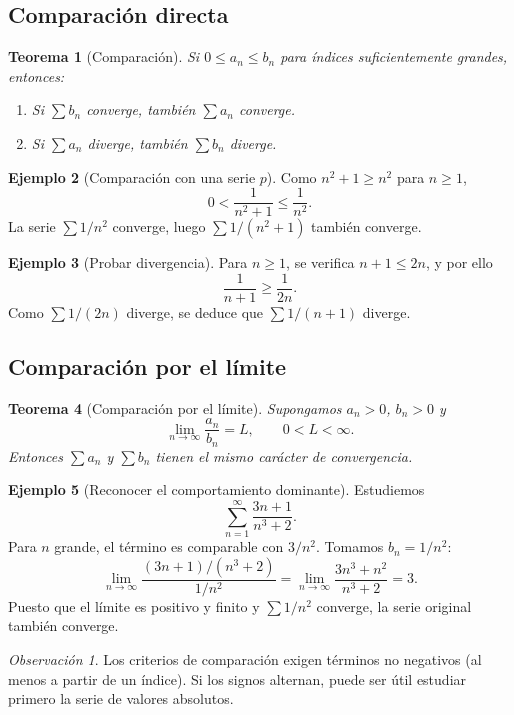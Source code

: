 \documentclass[12pt]{article}
\newtheorem{teorema}{Teorema}[section]
\theoremstyle{definition}
\newtheorem{ejemplo}[teorema]{Ejemplo}
\theoremstyle{remark}
\newtheorem*{observacion}{Observación}
\begin{document}
\subsection*{Comparación directa}
\begin{teorema}[Comparación]
Si $0\le a_n\le b_n$ para índices suficientemente grandes, entonces:
\begin{enumerate}[label=(\roman*)]
\item Si $\sum b_n$ converge, también $\sum a_n$ converge.
\item Si $\sum a_n$ diverge, también $\sum b_n$ diverge.
\end{enumerate}
\end{teorema}
\begin{ejemplo}[Comparación con una serie $p$]
Como $n^2+1\ge n^2$ para $n\ge1$,
\[0<\frac{1}{n^2+1}\le\frac1{n^2}.\]
La serie $\sum1/n^2$ converge, luego $\sum1/(n^2+1)$ también converge.
\end{ejemplo}
\begin{ejemplo}[Probar divergencia]
Para $n\ge1$, se verifica $n+1\le2n$, y por ello
\[\frac1{n+1}\ge\frac1{2n}.\]
Como $\sum1/(2n)$ diverge, se deduce que $\sum1/(n+1)$ diverge.
\end{ejemplo}

\subsection*{Comparación por el límite}
\begin{teorema}[Comparación por el límite]
Supongamos $a_n>0$, $b_n>0$ y
\[\lim_{n\to\infty}\frac{a_n}{b_n}=L,\qquad0<L<\infty.\]
Entonces $\sum a_n$ y $\sum b_n$ tienen el mismo carácter de convergencia.
\end{teorema}
\begin{ejemplo}[Reconocer el comportamiento dominante]
Estudiemos
\[\sum_{n=1}^\infty\frac{3n+1}{n^3+2}.\]
Para $n$ grande, el término es comparable con $3/n^2$. Tomamos $b_n=1/n^2$:
\[\lim_{n\to\infty}\frac{(3n+1)/(n^3+2)}{1/n^2}
=\lim_{n\to\infty}\frac{3n^3+n^2}{n^3+2}=3.\]
Puesto que el límite es positivo y finito y $\sum1/n^2$ converge, la serie original también converge.
\end{ejemplo}
\begin{observacion}
Los criterios de comparación exigen términos no negativos (al menos a partir de un índice). Si los signos alternan, puede ser útil estudiar primero la serie de valores absolutos.
\end{observacion}
\end{document}
